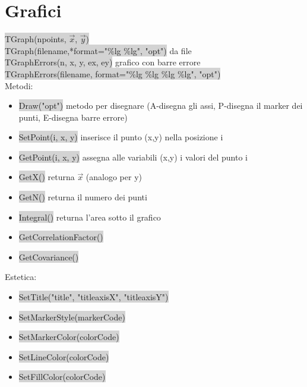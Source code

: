 \documentclass[a4paper]{article}
\begin{document}
\section{Grafici}
    \colorbox{LightGray}{TGraph(npoints, $\vec{x}$, $\vec{y}$)}\\
    \colorbox{LightGray}{TGraph(filename,*format="\%lg \%lg", "opt")} da file\\
    \colorbox{LightGray}{TGraphErrors(n, x, y, ex, ey)} grafico con barre errore\\
    \colorbox{LightGray}{TGraphErrors(filename, format="\%lg \%lg \%lg \%lg", "opt")}\\
    Metodi:
    \begin{itemize}
        \item \colorbox{LightGray}{Draw("opt")} metodo per disegnare (A-disegna gli assi, P-disegna il marker dei punti, E-disegna barre errore)
        \item \colorbox{LightGray}{SetPoint(i, x, y)} inserisce il punto (x,y) nella posizione i
        \item \colorbox{LightGray}{GetPoint(i, x, y)} assegna alle variabili (x,y) i valori del punto i
        \item \colorbox{LightGray}{GetX()} returna $\vec{x}$ (analogo per y)
        \item \colorbox{LightGray}{GetN()} returna il numero dei punti
        \item \colorbox{LightGray}{Integral()} returna l'area sotto il grafico
        \item \colorbox{LightGray}{GetCorrelationFactor()}
        \item \colorbox{LightGray}{GetCovariance()}
    \end{itemize}
    Estetica:
    \begin{itemize}
        \item \colorbox{LightGray}{SetTitle("title", "titleaxisX", "titleaxisY")}
        \item \colorbox{LightGray}{SetMarkerStyle(markerCode)}
        \item \colorbox{LightGray}{SetMarkerColor(colorCode)}
        \item \colorbox{LightGray}{SetLineColor(colorCode)}
        \item \colorbox{LightGray}{SetFillColor(colorCode)}
    \end{itemize}
\end{document}
